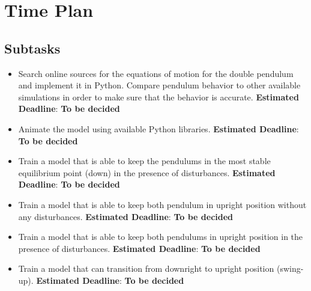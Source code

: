 \documentclass{article}
\begin{document}
\section{Time Plan}
\subsection{Subtasks}
	\begin{itemize}
		\item Search online sources for the equations of motion for the double pendulum and implement it in Python. Compare pendulum behavior to other available simulations in order to make sure that the behavior is accurate. \textbf{Estimated Deadline}: \textbf{To be decided}
		\item Animate the model using available Python libraries. \textbf{Estimated Deadline}: \textbf{To be decided}
		\item Train a model that is able to keep the pendulums in the most stable equilibrium point (down) in the presence of disturbances. \textbf{Estimated Deadline}: \textbf{To be decided}
		\item Train a model that is able to keep both pendulum in upright position without any disturbances. \textbf{Estimated Deadline}: \textbf{To be decided}
		\item Train a model that is able to keep both pendulums in upright position in the presence of disturbances. \textbf{Estimated Deadline}: \textbf{To be decided}
		\item Train a model that can transition from downright to upright position (swing-up). \textbf{Estimated Deadline}: \textbf{To be decided}
	\end{itemize}
\end{document}
